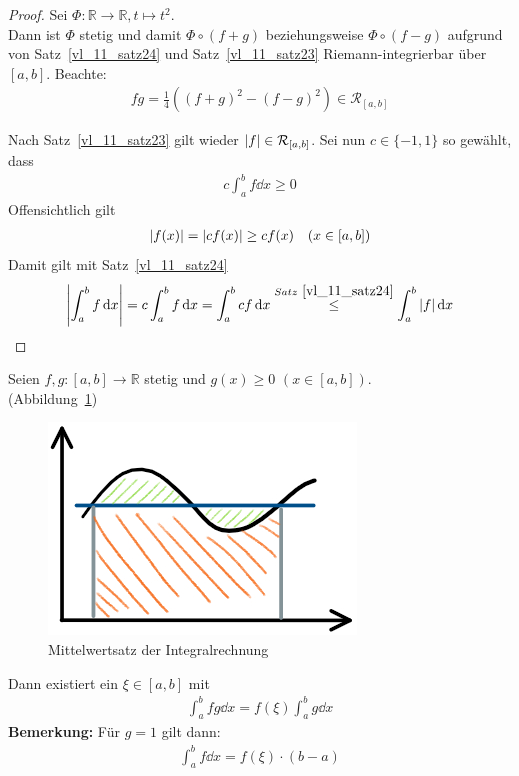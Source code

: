 \begin{proof}
	Sei $\Phi : \mathbb{R} \rightarrow  \mathbb{R}, t \mapsto t^2$. \\
	Dann ist
	$\Phi$ stetig und damit $\Phi \circ (f+g) $ beziehungsweise $\Phi \circ (f -g)$ 
	aufgrund von Satz~\ref{vl_11_satz24} und Satz~\ref{vl_11_satz23}
	Riemann-integrierbar über $[a,b]$.
	Beachte: 
	\begin{align*}
		f g = \frac{1}{4} ((f + g)^2 - (f-g)^2) \in \mathcal{R}_{[a,b]}
	\end{align*}
	\item Nach Satz~\ref{vl_11_satz23}
	gilt wieder $\abs{f} \in \mathcal{R}_{[a,b]}$. Sei nun $c \in \{-1, 1\}$ so 
	gewählt, dass 
	\begin{align*}
		c \int_a^b f \dd{x} \geq 0
	\end{align*}
	Offensichtlich gilt 
	\begin{align*}
		\abs{f(x)} = \abs{c f(x)} \geq c f(x) \quad (x \in [a,b])
	\end{align*}
	Damit gilt mit Satz~\ref{vl_11_satz24}
	\begin{align*}
		\abs{\int_a^b f\dd{x}} = c \int_a^b f\dd{x} = \int_a^b cf \dd{x} 
		\overset{Satz~\ref{vl_11_satz24}}{\le} \int_a^b \abs{f}\dd{x}
	\end{align*}
\end{proof}

\begin{Satz}{
	\label{satz:mws_integral}
	Seien $f,g: [a,b] \rightarrow \mathbb{R}$ stetig und 
	$g(x) \geq 0$ $(x \in[a,b])$. \\
	(Abbildung~\ref{plot_MWS_int}) 
	\begin{figure}
	\begin{center}
		\includegraphics[scale=0.5]{Skizzen/mws_int}
	\end{center}
	\caption{Mittelwertsatz der Integralrechnung}
	\label{plot_MWS_int}
	\end{figure}		
	
	Dann existiert ein $\xi \in [a,b]$ mit 
	\begin{align*}
		\int_a^b f g \dd{x} = f(\xi) \int_a^b g\dd{x}
	\end{align*}
	\textbf{Bemerkung:}
	Für $g = 1$ gilt dann: 
	\begin{align*}
		\int_a^b f \dd{x} = f(\xi) \cdot (b-a)
	\end{align*}
}\end{Satz}

